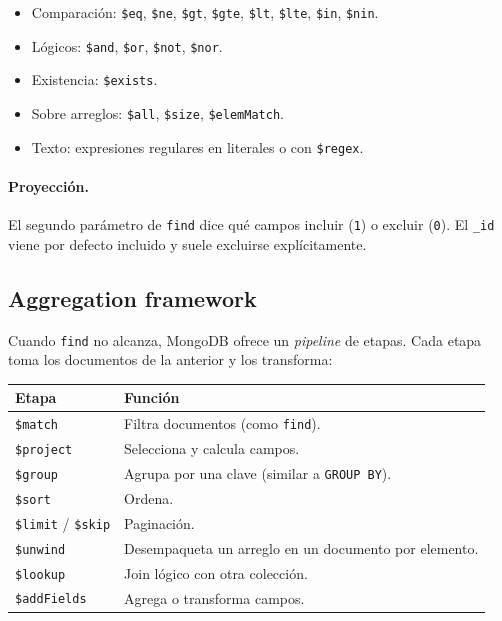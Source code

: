 \documentclass[11pt,a4paper]{article}
\begin{document}
\begin{itemize}
    \item Comparación: \texttt{\$eq}, \texttt{\$ne}, \texttt{\$gt},
    \texttt{\$gte}, \texttt{\$lt}, \texttt{\$lte}, \texttt{\$in},
    \texttt{\$nin}.
    \item Lógicos: \texttt{\$and}, \texttt{\$or}, \texttt{\$not},
    \texttt{\$nor}.
    \item Existencia: \texttt{\$exists}.
    \item Sobre arreglos: \texttt{\$all}, \texttt{\$size},
    \texttt{\$elemMatch}.
    \item Texto: expresiones regulares en literales o con \texttt{\$regex}.
\end{itemize}

\paragraph{Proyección.} El segundo parámetro de \texttt{find} dice qué
campos incluir (\texttt{1}) o excluir (\texttt{0}). El \texttt{\_id}
viene por defecto incluido y suele excluirse explícitamente.

\subsection{Aggregation framework}

Cuando \texttt{find} no alcanza, MongoDB ofrece un \emph{pipeline} de
etapas. Cada etapa toma los documentos de la anterior y los transforma:

\begin{center}
\begin{tabular}{ll}
\toprule
Etapa & Función \\
\midrule
\texttt{\$match}     & Filtra documentos (como \texttt{find}). \\
\texttt{\$project}   & Selecciona y calcula campos. \\
\texttt{\$group}     & Agrupa por una clave (similar a \texttt{GROUP BY}). \\
\texttt{\$sort}      & Ordena. \\
\texttt{\$limit} / \texttt{\$skip} & Paginación. \\
\texttt{\$unwind}    & Desempaqueta un arreglo en un documento por elemento. \\
\texttt{\$lookup}    & Join lógico con otra colección. \\
\texttt{\$addFields} & Agrega o transforma campos. \\
\bottomrule
\end{tabular}
\end{center}
\end{document}
